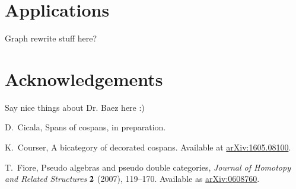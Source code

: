 \documentclass[oneside]{amsart}
\theoremstyle{definition}
\theoremstyle{remark}
\numberwithin{equation}{section}
\begin{document}
\section{Applications}
Graph rewrite stuff here?

\section{Acknowledgements}
Say nice things about Dr. Baez here :)

\begin{thebibliography}{100}



 





 D.\ Cicala, Spans of cospans, in preparation.


 K.\ Courser, A bicategory of decorated cospans. Available at \href{https://arxiv.org/pdf/1605.08100v2.pdf}{arXiv:1605.08100}.

 T.\ Fiore, Pseudo algebras and pseudo double categories, \emph{Journal of Homotopy and Related Structures} $\bold{2}$ (2007), 119--170. Available as \href{http://arxiv.org/abs/math/0608760}{arXiv:0608760}.







\end{thebibliography}
\end{document}
